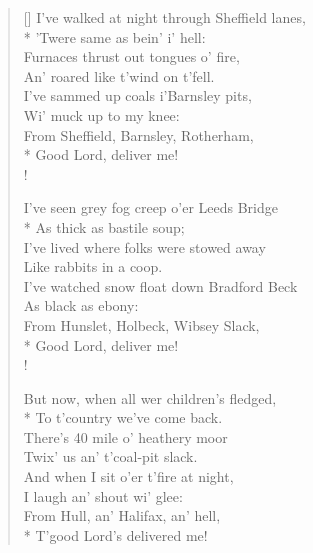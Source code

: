 \documentclass[MAIN]{subfiles}
\begin{document}
\begin{verse}[\versewidth]
I've walked at night through {\sc Sheffield} lanes,\\*
\vin 'Twere same as bein' i' hell:\\
Furnaces thrust out tongues o' fire,\\
\vin An' roared like t'wind on t'fell.\\
I've sammed up coals i'{\sc Barnsley} pits,\\
\vin Wi' muck up to my knee:\\
From {\sc Sheffield}, {\sc Barnsley}, {\sc Rotherham},\\*
\vin Good Lord, deliver me!\\!

I've seen grey fog creep o'er {\sc Leeds Bridge}\\*
\vin As thick as bastile soup;\\
I've lived where folks were stowed away\\
\vin Like rabbits in a coop.\\
I've watched snow float down {\sc Bradford Beck}\\
\vin As black as ebony:\\
From {\sc Hunslet}, {\sc Holbeck}, {\sc Wibsey Slack},\\*
\vin Good Lord, deliver me!\\!

But now, when all wer children's fledged,\\*
\vin To t'country we've come back.\\
There's 40 mile o' heathery moor\\
\vin Twix' us an' t'coal-pit slack.\\
And when I sit o'er t'fire at night,\\
\vin I laugh an' shout wi' glee:\\
From {\sc Hull}, an' {\sc Halifax}, an' hell,\\*
\vin T'good Lord's delivered me!
\end{verse}
\end{document}
